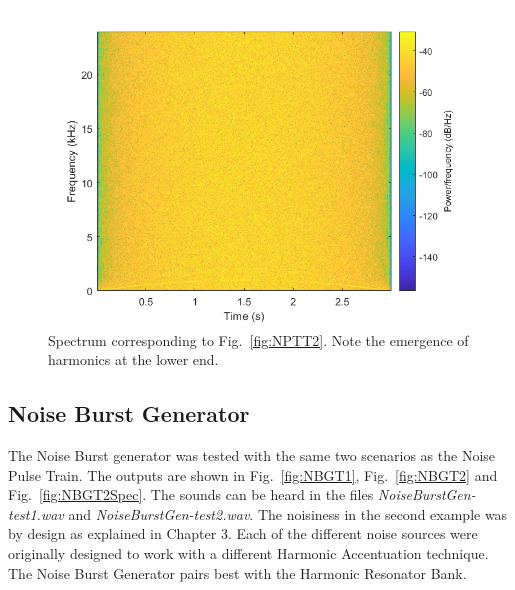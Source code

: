 \documentclass[../main.tex]{subfiles}
\begin{document}
\begin{figure}[b]
    \centering
    \includegraphics[scale=.65]{./images/plots/NPTTest2Spectrum.png}
    \caption{Spectrum corresponding to Fig.~\ref{fig:NPTT2}. Note the emergence of harmonics at the lower end.}
    \label{fig:NPTT2Spec}
\end{figure}

\clearpage

\subsection{Noise Burst Generator}
\label{sec:NBGVerify}
The Noise Burst generator was tested with the same two scenarios as the Noise Pulse Train. The outputs are shown in Fig.~\ref{fig:NBGT1}, Fig.~\ref{fig:NBGT2} and Fig.~\ref{fig:NBGT2Spec}. The sounds can be heard in the files \emph{NoiseBurstGen-test1.wav} and \emph{NoiseBurstGen-test2.wav}. The noisiness in the second example was by design as explained in Chapter 3. Each of the different noise sources were originally designed to work with a different Harmonic Accentuation technique. The Noise Burst Generator pairs best with the Harmonic Resonator Bank.
\end{document}
